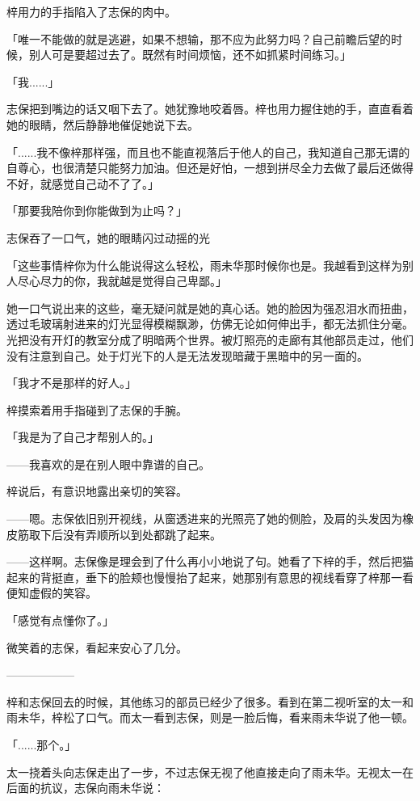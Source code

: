\documentclass[UTF8]{ctexart}
\begin{document}
    梓用力的手指陷入了志保的肉中。

    「唯一不能做的就是逃避，如果不想输，那不应为此努力吗？自己前瞻后望的时候，别人可是要超过去了。既然有时间烦恼，还不如抓紧时间练习。」

    「我......」

    志保把到嘴边的话又咽下去了。她犹豫地咬着唇。梓也用力握住她的手，直直看着她的眼睛，然后静静地催促她说下去。

    「......我不像梓那样强，而且也不能直视落后于他人的自己，我知道自己那无谓的自尊心，也很清楚只能努力加油。但还是好怕，一想到拼尽全力去做了最后还做得不好，就感觉自己动不了了。」

    「那要我陪你到你能做到为止吗？」

    志保吞了一口气，她的眼睛闪过动摇的光

    「这些事情梓你为什么能说得这么轻松，雨未华那时候你也是。我越看到这样为别人尽心尽力的你，我就越是觉得自己卑鄙。」

    她一口气说出来的这些，毫无疑问就是她的真心话。她的脸因为强忍泪水而扭曲，透过毛玻璃射进来的灯光显得模糊飘渺，仿佛无论如何伸出手，都无法抓住分毫。光把没有开灯的教室分成了明暗两个世界。被灯照亮的走廊有其他部员走过，他们没有注意到自己。处于灯光下的人是无法发现暗藏于黑暗中的另一面的。

    「我才不是那样的好人。」

    梓摸索着用手指碰到了志保的手腕。

    「我是为了自己才帮别人的。」

    ——我喜欢的是在别人眼中靠谱的自己。

    梓说后，有意识地露出亲切的笑容。

    ——嗯。志保依旧别开视线，从窗透进来的光照亮了她的侧脸，及肩的头发因为橡皮筋取下后没有弄顺所以到处都跳了起来。

    ——这样啊。志保像是理会到了什么再小小地说了句。她看了下梓的手，然后把猫起来的背挺直，垂下的脸颊也慢慢抬了起来，她那别有意思的视线看穿了梓那一看便知虚假的笑容。

    「感觉有点懂你了。」

    微笑着的志保，看起来安心了几分。

    ——————

    梓和志保回去的时候，其他练习的部员已经少了很多。看到在第二视听室的太一和雨未华，梓松了口气。而太一看到志保，则是一脸后悔，看来雨未华说了他一顿。

    「......那个。」

    太一挠着头向志保走出了一步，不过志保无视了他直接走向了雨未华。无视太一在后面的抗议，志保向雨未华说：
\end{document}
